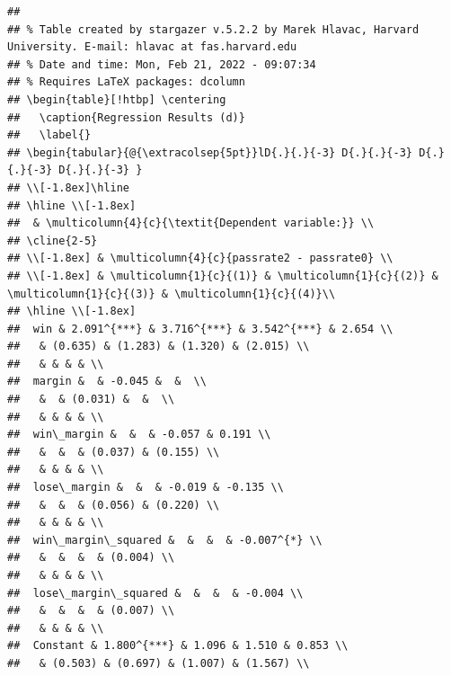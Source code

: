 \documentclass[
  12pt,
  landscape]{article}
\begin{document}
\begin{verbatim}
## 
## % Table created by stargazer v.5.2.2 by Marek Hlavac, Harvard University. E-mail: hlavac at fas.harvard.edu
## % Date and time: Mon, Feb 21, 2022 - 09:07:34
## % Requires LaTeX packages: dcolumn 
## \begin{table}[!htbp] \centering 
##   \caption{Regression Results (d)} 
##   \label{} 
## \begin{tabular}{@{\extracolsep{5pt}}lD{.}{.}{-3} D{.}{.}{-3} D{.}{.}{-3} D{.}{.}{-3} } 
## \\[-1.8ex]\hline 
## \hline \\[-1.8ex] 
##  & \multicolumn{4}{c}{\textit{Dependent variable:}} \\ 
## \cline{2-5} 
## \\[-1.8ex] & \multicolumn{4}{c}{passrate2 - passrate0} \\ 
## \\[-1.8ex] & \multicolumn{1}{c}{(1)} & \multicolumn{1}{c}{(2)} & \multicolumn{1}{c}{(3)} & \multicolumn{1}{c}{(4)}\\ 
## \hline \\[-1.8ex] 
##  win & 2.091^{***} & 3.716^{***} & 3.542^{***} & 2.654 \\ 
##   & (0.635) & (1.283) & (1.320) & (2.015) \\ 
##   & & & & \\ 
##  margin &  & -0.045 &  &  \\ 
##   &  & (0.031) &  &  \\ 
##   & & & & \\ 
##  win\_margin &  &  & -0.057 & 0.191 \\ 
##   &  &  & (0.037) & (0.155) \\ 
##   & & & & \\ 
##  lose\_margin &  &  & -0.019 & -0.135 \\ 
##   &  &  & (0.056) & (0.220) \\ 
##   & & & & \\ 
##  win\_margin\_squared &  &  &  & -0.007^{*} \\ 
##   &  &  &  & (0.004) \\ 
##   & & & & \\ 
##  lose\_margin\_squared &  &  &  & -0.004 \\ 
##   &  &  &  & (0.007) \\ 
##   & & & & \\ 
##  Constant & 1.800^{***} & 1.096 & 1.510 & 0.853 \\ 
##   & (0.503) & (0.697) & (1.007) & (1.567) \\ 

\end{verbatim}
\end{document}
